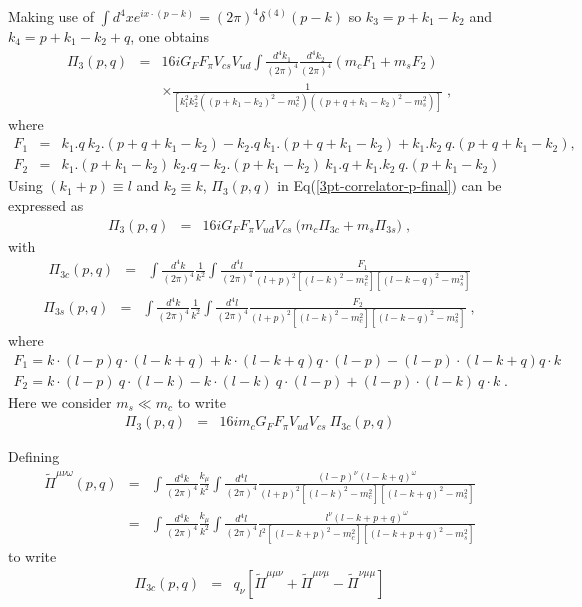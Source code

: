 \documentclass[twoside]{article}
\newcommand{\beq}{\begin{eqnarray}}
\newcommand{\eeq}{\end{eqnarray}}
\begin{document}
\begin{appendix}
\noindent
Making use of $\int d^4x e^{ix \cdot (p-k)}=(2\pi)^4 \delta^{(4)}(p-k)$ so $k_3 = p + k_1 - k_2$
and $k_4 = p + k_1 - k_2 + q$, one obtains
\beq
\label{3pt-correlator-p-final}
\Pi_3(p,q) &=& 16 i G_F F_\pi V_{cs} V_{ud}
\int \frac{d^4 k_1}{(2\pi)^4}\frac{d^4 k_2}{(2\pi)^4} (m_c F_1 + m_s F_2) 
\nonumber \\
&& \times \frac{1}{[k_1^2 k_2^2((p +k_1 - k_2)^2-m_c^2)((p + q + k_1 - k_2)^2-m_s^2)]} \; ,
\eeq
where
\beq
\label{F1}
F_1 &=&  k_1.q ~k_2.(p+q+k_1-k_2) - k_2.q~k_1.(p+q+k_1-k_2) + k_1.k_2~q.(p+q+k_1-k_2),\qquad \\
F_2 &=& k_1.(p+k_1 - k_2) ~k_2.q - k_2.(p+k_1-k_2)~k_1.q + k_1.k_2~q.(p+k_1-k_2)
\eeq
Using $(k_1 + p) \equiv l$ and $k_2 \equiv k$, $\Pi_3(p,q)$ in 
Eq(\ref{3pt-correlator-p-final}) can be expressed as
\beq
\label{Pi3in3cAnd3s}
\Pi_{3}(p, q) &=&
16 i G_F F_\pi V_{ud} V_{cs} ~ \big(m_c \Pi_{3c} +  m_s \Pi_{3s} 
\big) 
\; ,
\eeq
with 
\beq
\label{Pi3c1}
\Pi_{3c}(p,q) &=& \int \frac{d^4 k}{(2 \pi)^4} \frac{1}{k^2}
\int \frac{d^4 l}{(2 \pi)^4} \frac{F_1}{(l+p)^2 \left[ (l-k)^2 - m_c^2  \right]
\left[ (l- k - q)^2 - m_s^2 \right]} 
\eeq 
\beq
\label{Pi3s1}
\Pi_{3s}(p,q) &=& \int \frac{d^4 k}{(2 \pi)^4} \frac{1}{k^2} 
\int \frac{d^4 l}{(2 \pi)^4}\frac{F_2}{(l+p)^2 \left[ (l-k)^2 - m_c^2  \right] 
\left[ (l - k - q)^2 - m_s^2 \right]}
\; ,
\eeq
where
\beq
\label{F1z}
F_1 =  k\cdot (l-p) q\cdot(l-k+q) +k\cdot(l-k+q)q\cdot(l-p) -
(l-p)\cdot (l-k+q) q\cdot k  
\eeq
\beq
\label{F2z}
F_2 =  k\cdot (l-p)~ q\cdot(l-k) - k\cdot(l-k)~q\cdot(l-p) +
(l-p)\cdot (l-k) ~q\cdot k \; .
\eeq
Here we consider $m_s \ll m_c$ to write
\begin{eqnarray}
\Pi_3(p,q) &=& 
16 i m_c G_F F_\pi V_{ud} V_{cs}~ \Pi_{3c} (p,q)
\end{eqnarray}

Defining
\begin{eqnarray}
\label{PimunuomegaAppendix}
\tilde{\Pi}^{\mu \nu \omega}(p,q)
&=&
\int \frac{d^4 k}{(2\pi)^4} \frac{k_\mu}{k^2}
\int \frac{d^4 l}{(2 \pi)^4}
\frac{(l-p)^\nu (l - k + q)^\omega}{(l+p)^2 \left[(l - k)^2 - m_c^2  \right] \left[  (l - k + q)^2 - m_s^2\right]} \nonumber\\
&=&
\int \frac{d^4 k}{(2\pi)^4} \frac{k_\mu}{k^2}
\int \frac{d^4 l}{(2 \pi)^4}
\frac{l^\nu (l - k + p + q)^\omega}{l^2 \left[(l - k + p)^2 - m_c^2  \right] \left[  (l - k + p + q)^2 - m_s^2\right]}
\end{eqnarray}
to write
\begin{eqnarray}
\label{Pi3c}
\Pi_{3c}(p,q)
&=&
q_\nu \left[
\tilde{\Pi}^{\mu \mu \nu} + \tilde{\Pi}^{\mu \nu \mu} - \tilde{\Pi}^{\nu \mu \mu}
\right]
\end{eqnarray}


\end{appendix}
\end{document}
